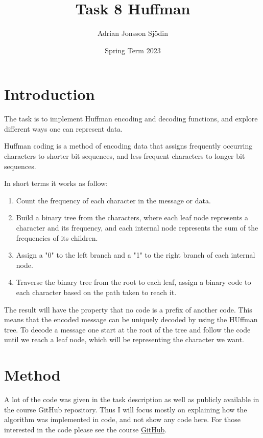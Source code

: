 \documentclass[a4paper,11pt]{article}
\begin{document}
\title{
    \textbf{Task 8 Huffman}
}
\author{Adrian Jonsson Sjödin}
\date{Spring Term 2023}

\maketitle

\section*{Introduction}
The task is to implement Huffman encoding and decoding functions, and explore different ways one can
represent data.

Huffman coding is a method of encoding data that assigns frequently occurring characters to shorter
bit sequences, and less frequent characters to longer bit sequences.

In short terms it works as follow:
\begin{enumerate}
    \item Count the frequency of each character in the message or data.
    \item Build a binary tree from the characters, where each leaf node represents a character and its frequency, and each internal
          node represents the sum of the frequencies of its children.
    \item Assign a "0" to the left branch and a "1" to the right branch of each internal node.
    \item Traverse the binary tree from the root to each leaf, assign a binary code to each character based on the path taken to
          reach it.
\end{enumerate}
The result will have the property that no code is a prefix of another code. This means that the encoded message can be uniquely
decoded by using the HUffman tree. To decode a message one start at the root of the tree and follow the code until we reach a leaf node,
which will be representing the character we want.

\section*{Method}
A lot of the code was given in the task description as well as publicly available in the course GitHub repository. Thus I will focus
mostly on explaining how the algorithm was implemented in code, and not show any code here. For those interested in the code please
see the course \href{https://github.com/ID1019/functional-programming}{GitHub}.
\end{document}
